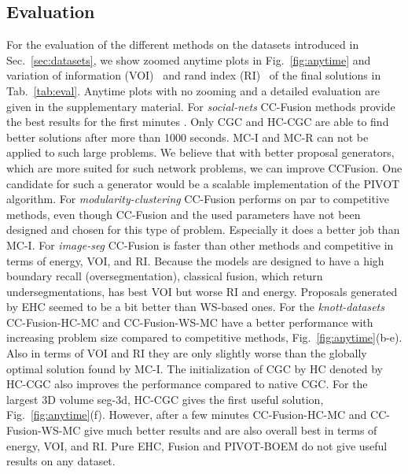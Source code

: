 \subsection{Evaluation}
For the evaluation of the different methods on the datasets introduced in Sec.~\ref{sec:datasets},
we show zoomed anytime plots in  Fig.~\ref{fig:anytime} and variation of information (VOI)~\cite{meila-2003}
and rand index (RI)~\cite{rand-1971} of the final solutions in Tab.~\ref{tab:eval}.
Anytime plots with no zooming and a detailed evaluation are given in the supplementary material. 
%
For \emph{social-nets} CC-Fusion methods provide the best results for the first minutes .
Only CGC and HC-CGC are able to find better solutions after more than 1000 seconds.
MC-I and MC-R can not be applied to such large problems.
We believe that with better proposal generators, which are more suited for such network problems,
we can improve CCFusion. One candidate for such a generator would be a scalable implementation of the 
PIVOT algorithm.
%
For \emph{modularity-clustering} CC-Fusion performs on par to competitive methods, even though CC-Fusion 
and the used parameters have not been designed and chosen for this type of problem.
Especially it does a better job than MC-I.
%
For \emph{image-seg} CC-Fusion is faster than other methods and competitive in terms of energy, VOI, and RI.
Because  the models are designed to have a high boundary recall (oversegmentation), 
classical fusion, which return undersegmentations, has best VOI but worse RI and energy.
Proposals generated by EHC seemed to be a bit better than WS-based ones.
%
For the \emph{knott-datasets}
CC-Fusion-HC-MC and CC-Fusion-WS-MC have a better performance with increasing problem size compared to competitive methods, \cf Fig.~\ref{fig:anytime}(b-e).
Also in terms of VOI and RI they are only slightly worse than the globally optimal solution found by MC-I.
The initialization of CGC by HC denoted by HC-CGC also improves the performance compared to native CGC.
For the largest 3D volume seg-3d, HC-CGC gives the first useful solution, \cf  Fig.~\ref{fig:anytime}(f).
However, after a few minutes  CC-Fusion-HC-MC and CC-Fusion-WS-MC give much better results and are also overall best in terms of energy, VOI, and RI.
%
Pure EHC, Fusion and PIVOT-BOEM do not give useful results on any dataset.
